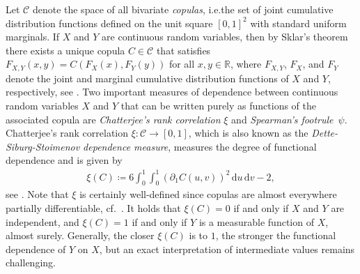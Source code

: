 \documentclass{article}
\newcommand{\1}{\mathds{1}}
\newcommand{\de}{\mathrm{\,d}}
\newcommand{\CC}{\mathcal{C}}  %
\begin{document}
Let $\CC$ denote the space of all bivariate \emph{copulas}, i.e.\;the set of joint cumulative distribution functions defined on the unit square $[0,1]^2$ with standard uniform marginals.
If $X$ and $Y$ are continuous random variables, then by Sklar's theorem there exists a unique copula $C\in\CC$ that satisfies
\(
    F_{X,Y}(x,y) = C(F_X(x), F_Y(y))
\)
for all \(x,y \in \mathbb{R}\), where \(F_{X,Y}\), \(F_X\), and \(F_Y\) denote the joint and marginal cumulative distribution functions of \(X\) and \(Y\), respectively, see \cite{sklar1959fonctions}.
Two important measures of dependence between continuous random variables $X$ and $Y$ that can be written purely as functions of the associated copula are \textit{Chatterjee's rank correlation} \(\xi\) and \textit{Spearman's footrule}~\(\psi\).
Chatterjee's rank correlation \(\xi:\CC\rightarrow[0,1]\), which is also known as the \emph{Dette-Siburg-Stoimenov dependence measure}, measures the degree of functional dependence and is given by
\begin{align}\label{eq:xi-definition}
\xi(C) \coloneq 6 \int_0^1\int_0^1 \left(\partial_1 C(u,v)\right)^2 \de u \de v - 2,
\end{align}
see \cite{chatterjee2020,dette2013copula}.
Note that $\xi$ is certainly well-defined since copulas are almost everywhere partially differentiable, cf.~\cite[Thm.~2.2.7]{Nelsen-2006}.
It holds that $\xi(C)=0$ if and only if $X$ and $Y$ are independent, and $\xi(C)=1$ if and only if $Y$ is a measurable function of $X$, almost surely. 
Generally, the closer \(\xi(C)\) is to \(1\), the stronger the functional dependence of \(Y\) on \(X\), but an exact interpretation of intermediate values remains challenging.
\end{document}
